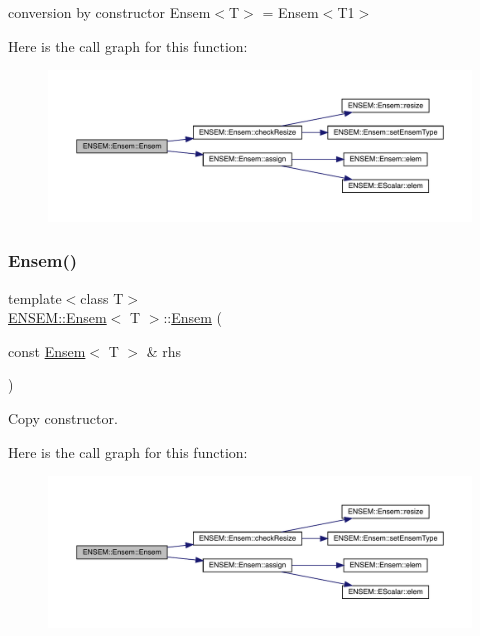 conversion by constructor Ensem$<$\+T$>$ = Ensem$<$\+T1$>$ 

Here is the call graph for this function\+:
\nopagebreak
\begin{figure}[H]
\begin{center}
\leavevmode
\includegraphics[width=350pt]{d7/d3e/classENSEM_1_1Ensem_ab0e04ebf09af997fb7f1477cdc48145b_cgraph}
\end{center}
\end{figure}
\mbox{\label{classENSEM_1_1Ensem_a5e80cf6ad71f96ba2fa28cac27f06003}} 
\subsubsection{\texorpdfstring{Ensem()}{Ensem()}\hspace{0.1cm}{\footnotesize\ttfamily [6/6]}}
{\footnotesize\ttfamily template$<$class T$>$ \\
\mbox{\hyperlink{classENSEM_1_1Ensem}{E\+N\+S\+E\+M\+::\+Ensem}}$<$ T $>$\+::\mbox{\hyperlink{classENSEM_1_1Ensem}{Ensem}} (\begin{DoxyParamCaption}\item[{const \mbox{\hyperlink{classENSEM_1_1Ensem}{Ensem}}$<$ T $>$ \&}]{rhs }\end{DoxyParamCaption})\hspace{0.3cm}{\ttfamily [inline]}}



Copy constructor. 

Here is the call graph for this function\+:
\nopagebreak
\begin{figure}[H]
\begin{center}
\leavevmode
\includegraphics[width=350pt]{d7/d3e/classENSEM_1_1Ensem_a5e80cf6ad71f96ba2fa28cac27f06003_cgraph}
\end{center}
\end{figure}


